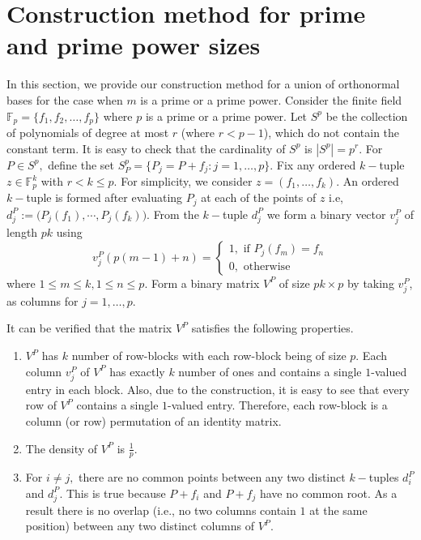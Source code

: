 \documentclass{IEEEtran}
\begin{document}
\section{Construction method for prime and prime power sizes}
\label{sec:consprimepower}
In this section, we provide our construction method for a union of orthonormal
bases for the case
when $m$ is a prime or a prime power. Consider the finite field
$\mathbb{F}_{p}=\{f_{1},f_{2},\dots,f_{p}\}$
where $p$ is a prime or a prime power.
Let $S^{p}$ be the collection of polynomials of degree at most
$r$ (where $r < p-1$), which do not contain the constant term. It is easy to
check that the cardinality
of $S^{p}$ is $|S^{p}|=p^{r}.$  For $P\in S^{p},$ define the set
$S^{p}_{P}=\{P_{j}=P+f_{j}:j=1, \dots, p\}$. Fix any ordered $k-$tuple
$z\in \mathbb{F}_p^k$ with $r<k\leq p$. For simplicity, we consider
$z=(f_{1}, \dots, f_{k})$.
An ordered $k-$tuple is formed
after evaluating $P_{j}$ at each of the points of $z$ i.e,
$d^{P}_{j} := \big(P_{j}(f_{1}), \cdots, P_{j}(f_{k})\big)$.
From the $k-$tuple
$d^{P}_{j}$ we form a binary
vector $v_j^{P}$ of length $pk$ using
$$
v_j^{P}(p(m-1)+n) =
\begin{cases}
  1, \text{~if~} P_j(f_m) = f_n\\
  0, \text{~otherwise}
\end{cases}
$$
where $1 \leq m \leq k, 1 \leq n \leq p$. Form a binary matrix $V^{P}$ of
size $pk \times p$ by taking $v_j^{P}$, as columns for $j=1,\dots,p.$ 

It can be verified that the matrix $V^{P}$ satisfies the following properties.
\begin{enumerate}
\item $V^{P}$ has $k$ number of row-blocks with each row-block being
  of size $p$. Each column $v^{P}_{j}$ of $V^{P}$ has exactly $k$ number of ones
  and
  contains a single $1$-valued entry in each block. Also, due to the
  construction, it is easy to see that every row of
  $V^{P}$ contains a single
  $1$-valued entry. Therefore, each row-block is a column (or row)
  permutation of an identity matrix.
\item The density of $V^{P}$ is $\frac{1}{p}.$
\item For $i\neq j,$ there are no common points between any two
  distinct $k-$tuples $d^{P}_{i}$ and $d^{P}_{j}$. This is true because
  $P+f_{i}$ and $P+f_{j}$ have no common root.  As a result there is no
  overlap (i.e., no two columns contain $1$ at the same position)
  between any two distinct columns of $V^{P}$.
\end{enumerate}
\end{document}
